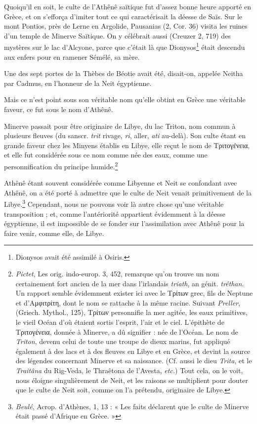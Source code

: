 \documentclass[a4paper, 11pt, oneside]{article}
\begin{document}
Quoiqu'il en soit, le culte de l'Athênê saïtique fut d'assez bonne heure apporté en Grèce, et on s'efforça d'imiter tout ce qui caractérisait la déesse de Saïs. Sur le mont Pontios, près de Lerne en Argolide, Pausanias (2, Cor. 36) visita les ruines d'un temple de Minerve Saïtique. On y célébrait aussi (Creuzer 2, 719) des mystères sur le lac d'Alcyone, parce que c'était là que Dionysos\footnote{Dionysos avait été assimilé à Osiris.} était descendu aux enfers pour en ramener Sémélé, sa mère.

Une des sept portes de la Thèbes de Béotie avait été, disait-on, appelée Neitha par Cadmus, en l'honneur de la Neit égyptienne.

Mais ce n'est point sous son véritable nom qu'elle obtint en Grèce une véritable faveur, ce fut sous le nom d'Athênê.

Minerve passait pour être originaire de Libye, du lac Triton, nom commun à plusieurs fleuves (du sanscr. \emph{trit} rivage, \emph{ri}, aller, \emph{ati} au-delà). Son culte étant en grande faveur chez les Minyens établis en Libye, elle reçut le nom de Τριτογένεια, et elle fut considérée sous ce nom comme née des eaux, comme une personnification du principe humide.\footnote{\emph{Pictet}, Les orig. indo-europ. 3, 452, remarque qu'on trouve un nom certainement fort ancien de la mer dans l'irlandais \emph{triath}, an génit. \emph{tréthan}. Un rapport semble évidemment exister ici avec le Τρίτων grec, fils de Neptune et d'Αμφιτρίτη, dont le nom se rattache à la même racine.  Suivant \emph{Preller}, (Griech. Mythol., 125), Τρίτων personnifie la mer agitée, les eaux primitives, le vieil Océan d'où étaient sortis l'esprit, l'air et le ciel. L'épithète de Τριτογένεια, donnée à Minerve, a dû signifier : née de l'Océan. Le nom de \emph{Triton}, devenu celui de toute une troupe de dieux marins, fut appliqué également à des lacs et à des fleuves en Libye et en Grèce, et devint la source des légendes concernant Minerve et sa naissance. (Cf. aussi le dieu \emph{Trita}, et le \emph{Traitâna} du Rig-Veda, le Thraêtona de l'Avesta, \emph{etc.})  Tout cela, on le voit, nous éloigne singulièrement de Neit, et les raisons se multiplient pour douter que le culte de Neit soit, comme on l'a prétendu, originaire de Libye.}

Athênê étant souvent considérée comme Libyenne et Neit se confondant avec Athênê, on a été porté à admettre que le culte de Neit venait primitivement de la Libye.\footnote{\emph{Beulé}, Acrop. d'Athènes, 1, 13 : « Les faits déclarent que le culte de Minerve était passé d'Afrique en Grèce. »} Cependant, nous ne pouvons voir là autre chose qu'une véritable transposition ; et, comme l'antériorité appartient évidemment à la déesse égyptienne, il est impossible de se fonder sur l'assimilation avec Athênê pour la faire venir, comme elle, de Libye.
\end{document}

